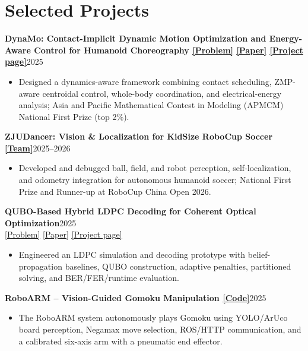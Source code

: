 \documentclass[10pt,letterpaper]{article}
\newcommand{\project}[2]{\textbf{#1}\hfill #2}
\newcommand{\link}[2]{\href{#1}{\textcolor{accent}{\underline{#2}}}}
\begin{document}
\section{Selected Projects}
\project{Dyna\textbf{Mo}: Contact-Implicit Dynamic Motion Optimization and Energy-Aware Control for Humanoid Choreography \link{https://styokuok.github.io/dynamo/docs/problem-A.pdf}{[Problem]} \link{https://styokuok.github.io/dynamo/docs/dynamo-research-paper.pdf}{[Paper]} \link{https://styokuok.github.io/dynamo/}{[Project page]}}{2025}
\begin{itemize}
\item Designed a dynamics-aware framework combining contact scheduling, ZMP-aware centroidal control, whole-body coordination, and electrical-energy analysis; Asia and Pacific Mathematical Contest in Modeling (APMCM) National First Prize (top 2\%).
\end{itemize}

\project{ZJUDancer: Vision \& Localization for KidSize RoboCup Soccer \link{https://zjudancer.github.io/}{[Team]}}{2025--2026}
\begin{itemize}
\item Developed and debugged ball, field, and robot perception, self-localization, and odometry integration for autonomous humanoid soccer; National First Prize and Runner-up at RoboCup China Open 2026.
\end{itemize}

\project{QUBO-Based Hybrid LDPC Decoding for Coherent Optical Optimization}{2025}\\[-1pt]
{\small \link{https://github.com/StyoKuok/qubo-hybrid-ldpc-decoding/blob/main/competition_problem_B_en.pdf}{[Problem]} \link{https://github.com/StyoKuok/qubo-hybrid-ldpc-decoding/blob/main/ldpc_decoding_ieee_en.pdf}{[Paper]} \link{https://styokuok.github.io/main/projects/quantum-ldpc/}{[Project page]}}
\begin{itemize}
\item Engineered an LDPC simulation and decoding prototype with belief-propagation baselines, QUBO construction, adaptive penalties, partitioned solving, and BER/FER/runtime evaluation.
\end{itemize}

\project{RoboARM -- Vision-Guided Gomoku Manipulation \link{https://gitee.com/zjuatri/chess/tree/main/gobang_ws/src}{[Code]}}{2025}
\begin{itemize}
\item The RoboARM system autonomously plays Gomoku using YOLO/ArUco board perception, Negamax move selection, ROS/HTTP communication, and a calibrated six-axis arm with a pneumatic end effector.
\end{itemize}
\end{document}
